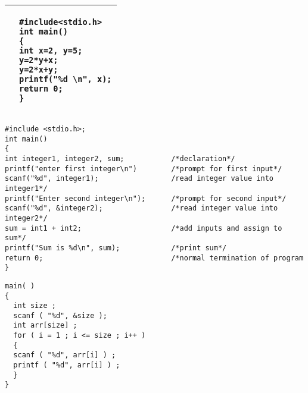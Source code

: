\documentclass{ipu-papers}
\begin{document}
\begin{qsection}
\begin{subqsection}
\begin{tabular}{|p{}|p{}|}
\begin{minipage}{0.46\textwidth}
\begin{verbatim}
                    \end{verbatim}
                \end{minipage}
                & \begin{minipage}{0.46\textwidth}
                      \begin{verbatim}
#include<stdio.h>
int main()
{
int x=2, y=5;
y=2*y+x;
y=2*x+y;
printf("%d \n", x);
return 0;
}

                      \end{verbatim}
                \end{minipage} \\
                \hline
            \end{tabular}
            \newpage
            \begin{subsubqsection}
                \question{}\vspace*{-15pt}
                \begin{verbatim}
#include <stdio.h>;
int main()
{
int integer1, integer2, sum;           /*declaration*/
printf("enter first integer\n")        /*prompt for first input*/
scanf("%d", integer1);                 /read integer value into integer1*/
printf("Enter second integer\n");      /*prompt for second input*/
scanf("%d", &integer2);                /*read integer value into integer2*/
sum = int1 + int2;                     /*add inputs and assign to sum*/
printf("Sum is %d\n", sum);            /*print sum*/
return 0;                              /*normal termination of program
}
                \end{verbatim}
                \vspace*{20pt}
                \question{}\vspace*{-15pt}
                \begin{verbatim}
main( )
{
  int size ;
  scanf ( "%d", &size );
  int arr[size] ;
  for ( i = 1 ; i <= size ; i++ )
  {
  scanf ( "%d", arr[i] ) ;
  printf ( "%d", arr[i] ) ;
  }
}
                \end{verbatim}
            \end{subsubqsection}
        \end{subqsection}
    \end{qsection}
\end{document}

